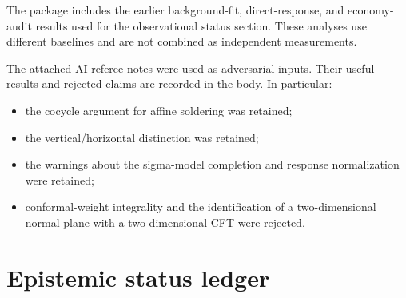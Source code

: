 \documentclass[
  11pt,
  letterpaper,
]{article}
\providecommand{\tightlist}{%
  \setlength{\itemsep}{0pt}\setlength{\parskip}{0pt}}
\begin{document}
The package includes the earlier background-fit, direct-response, and
economy-audit results used for the observational status section. These
analyses use different baselines and are not combined as independent
measurements.

The attached AI referee notes were used as adversarial inputs. Their
useful results and rejected claims are recorded in the body. In
particular:

\begin{itemize}
\tightlist
\item
  the cocycle argument for affine soldering was retained;
\item
  the vertical/horizontal distinction was retained;
\item
  the warnings about the sigma-model completion and response
  normalization were retained;
\item
  conformal-weight integrality and the identification of a
  two-dimensional normal plane with a two-dimensional CFT were rejected.
\end{itemize}

\section{Epistemic status ledger}\label{epistemic-status-ledger}
\end{document}
